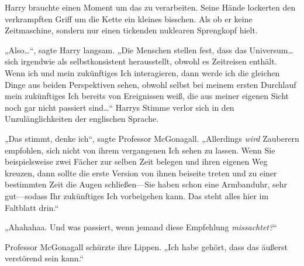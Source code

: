 Harry brauchte einen Moment um das zu verarbeiten. Seine Hände lockerten den verkrampften Griff um die Kette ein kleines bisschen. Als ob er keine Zeitmaschine, sondern nur einen tickenden nuklearen Sprengkopf hielt.

„Also…“, sagte Harry langsam. „Die Menschen stellen fest, dass das Universum…sich irgendwie als selbstkonsistent herausstellt, obwohl es Zeitreisen enthält. Wenn ich und mein zukünftiges Ich interagieren, dann werde ich die gleichen Dinge aus beiden Perspektiven sehen, obwohl selbst bei meinem ersten Durchlauf mein zukünftiges Ich bereits von Ereignissen weiß, die aus meiner eigenen Sicht noch gar nicht passiert sind…“ Harrys Stimme verlor sich in den Unzulänglichkeiten der englischen Sprache.

„Das stimmt, denke ich“, sagte Professor McGonagall. „Allerdings \emph{wird} Zauberern empfohlen, sich nicht von ihrem vergangenen Ich sehen zu lassen. Wenn Sie beispielsweise zwei Fächer zur selben Zeit belegen und ihren eigenen Weg kreuzen, dann sollte die erste Version von ihnen beiseite treten und zu einer bestimmten Zeit die Augen schließen—Sie haben schon eine Armbanduhr, sehr gut—sodass Ihr zukünftiges Ich vorbeigehen kann. Das steht alles hier im Faltblatt drin.“

„Ahahahaa. Und was passiert, wenn jemand diese Empfehlung \emph{missachtet?}“

Professor McGonagall schürzte ihre Lippen. „Ich habe gehört, dass das äußerst verstörend sein kann.“

